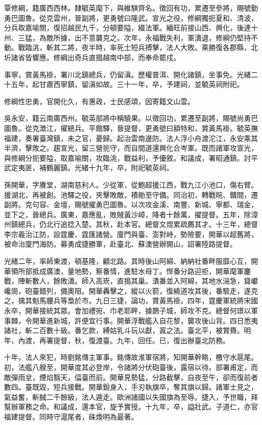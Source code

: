 \begin{pinyinscope}
覃修綱，籍廣西西林。隸毓英麾下，與維騏齊名。徵回有功，累遷至參將，賜號勤勇巴圖魯。從克雲州，晉副將，更勇號曰隆武。宣光之役，修綱獨扼夏和、清波，分兵取嘉喻關，復招越民九千，分頓要隘，綴法軍。緬旺前接山西、興化，後達十州、三猛，為敵所據，出不意襲克之。次年，永福戰失利，軍潰退，修綱仍堅持不動。戰臨洮，斬其二將，夜半時，率死士短兵搏擊，法人大敗。乘勝復各郡縣，北圻諸省皆響應。修綱出奇兵直搗越南中部，而奉命罷戍。

事寧，賞黃馬褂，署川北鎮總兵，仍留滇。歷權普洱、開化諸鎮，坐事免。光緒二十五年，起甘肅西寧鎮，留滇如故。三十一年，卒，予建祠，並毓英祠附祀。

修綱性忠勇，官開化久，有惠政，士民感頌，因寄籍文山雲。

吳永安，籍云南廣西州。毓英部將中稱驍果。以徵回功，累遷至副將，賜號尚勇巴圖魯。從克澂江，擢總兵。平館驛，晉提督，更勇號曰額特和，賞黃馬褂。毓英撫福建，奏署臺灣鎮，未之官，憂歸。起治雲南邊防。法人浮小舟渡沱江，永安乘其半濟，擊敗之。趨宣光，留三營扼守，而自間道還興化合岑軍。既而諸軍攻宣光，與修綱分扼要隘，取嘉喻關，攻臨洮，戰益利，予優敘。和議成，署昭通鎮。討平武定夷匪，補鶴麗鎮。光緒十九年，卒，附祀毓英祠。

孫開華，字賡堂，湖南慈利人。少從軍，從鮑超援江西，戰九江小池口，傷右臂。援湖北，再被創。池驛之役，夾擊敗敵，積勛至守備。同治初，轉戰皖、贛間，遷副將。克句容、金壇，賜號擢勇巴圖魯。以次攻金溪、南豐、新城、寧都、瑞金，並下之，晉總兵。廣東，嘉應亂，敗賊黃沙嶂，降者十餘萬，擢提督。五年，除漳州鎮總兵，仍北行追捻入楚。其秋，赴本官。總督文煜累疏薦其才。十三年，總督李宗羲治江防，設霆慶、霆匯諸營。廈門與臺、澎對峙，勢險要，開華以超舊將，被命治廈門海防。募勇成捷勝軍，赴臺北、蘇澳營辦開山，詔署陸路提督。

光緒二年，率師東渡，頓基隆，顧北路。其時後山阿綿、納納社番畔服靡心互，開華領所部抵成廣澳，量地勢，察番情，進駐水母丁。悍番分路迎拒，開華麾軍鏖戰，陣斬數人，餘敗潰。師入高崁，直搗其巢。潰番並入阿綿，其地水湍急，聳巘巉崗，砲臺錯列，備奧阻。開華轟擊之，縱以火箭，復繞道攻其後，番駭走，遂克之，擒其魁馬腰兵等梟於市。九日三捷，論功，賞黃馬褂。四年，霆慶軍統將宋國永卒，開華接統其眾。會加禮宛、巾老耶畔，據鵲子城，師攻不克。總督何璟以軍事棘，令開華進新城，許便宜行事。開華浮戰艦入自花黎，襲攻後山背。四日悉夷諸社，斬二百數十級。番乞款，縛姑乳斗玩以獻，寘之法。臺北平，被賞賚。明年，內渡，再署提督，秋，復渡臺。九年，回任。已，復出辦臺北防務。

十年，法人來犯，時劉銘傳主軍事。銘傳故淮軍宿將，知開華幹略，檄守水扈尾。初，法艦八艘至，開華度其必登岸，令諸將分伏砲臺後，露宿以待。部署甫定，而敵彈雨坌，煙焰翳天，偪臺而前。開華見勢猛，分路截擊，自夜至午，卻而復前者數四。臺既毀，短兵接戰。開華銳身入，手刃執旗卒，奪其旗以歸。諸軍士見之，氣益奮，斬馘二千餘級，法人遁走。歐洲諸國以失國旗為至辱。捷入，予世職，拜幫辦軍務之命。和議成，還本官，旋予實授。十九年，卒，謚壯武。子道仁，亦官福建提督。同時守滬尾者，硃煥明為最著。


\end{pinyinscope}
